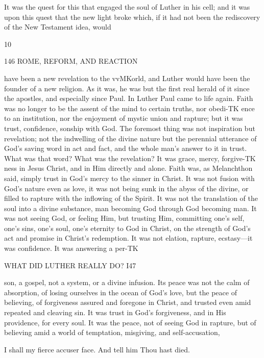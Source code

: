 \documentclass[12pt,a5paper,twoside]{book}
\begin{document}
{It was the quest for this that engaged the soul 
of Luther in his cell; and it was upon this quest 
that the new light broke which, if it had not been 
the rediscovery of the New Testament idea, would 

10 



146 ROME, REFORM, AND REACTION 

have been a new revelation to the vvMKorld, and Luther 
would have been the founder of a new religion. As 
it was, he was but the first real herald of it since 
the apostles, and especially since Paul. In Luther 
Paul came to life again. Faith was no longer to be 
the assent of the mind to certain truths, nor obedi-TK
ence to an institution, nor the enjoyment of mystic 
union and rapture; but it was trust, confidence, 
sonship with God. The foremost thing was not 
inspiration but revelation; not the indwelling of the 
divine nature but the perennial utterance of God's 
saving word in act and fact, and the whole man's 
answer to it in trust. What was that word? What 
was the revelation? It was grace, mercy, forgive-TK
ness in Jesus Christ, and in Him directly and alone. 
Faith was, as Melanchthon said, simply trust in God's 
mercy to the sinner in Christ. It was not fusion with 
God's nature even as love, it was not being sunk in 
the abyss of the divine, or filled to rapture with the 
inflowing of the Spirit. It was not the translation 
of the soul into a divine substance, man becoming 
God through God becoming man. It was not seeing 
God, or feeling Him, but trusting Him, committing 
one's self, one's sins, one's soul, one's eternity to God 
in Christ, on the strength of God's act and promise 
in Christ's redemption. It was not elation, rapture, 
ecstasy---it was confidence. It was answering a per-TK



WHAT DID LUTHER REALLY DO? I47 

son, a gospel, not a system, or a divine infusion. 
Its peace was not the calm of absorption, of losing 
ourselves in the ocean of God's love, but the peace 
of believing, of forgiveness assured and foregone in 
Christ, and trusted even amid repeated and cleaving 
sin. It was trust in God's forgiveness, and in His 
providence, for every soul. It was the peace, not of 
seeing God in rapture, but of believing amid a world 
of temptation, misgiving, and self-accusation, 

I shall my fierce accuser face. 
And tell him Thou hast died. 

}
\end{document}
